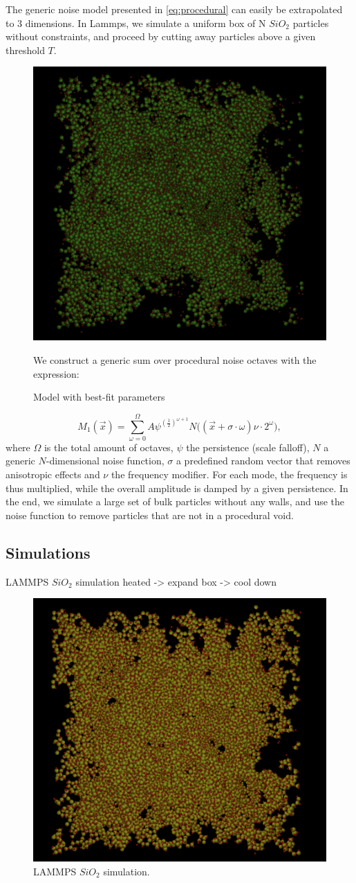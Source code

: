 \documentclass[aps,pre,twocolumn,letterpaper,floatfix,showpacs]{revtex4}
\begin{document}
The generic noise model presented in \ref{eq:procedural} can easily be extrapolated to 3 dimensions. In Lammps, we
simulate a uniform box of N $SiO_2$ particles without constraints, and proceed by cutting away particles above a given threshold $T$.
\begin{figure}
\includegraphics[width=.45\textwidth]{pores2.png}
%
\caption{Model with best-fit parameters}
We construct a generic sum over procedural noise octaves with the expression: 
\label{fig:model12}
\end{figure}
\begin{equation}
	M_1(\vec x) = \sum_{\omega=0}^{\Omega} A \psi^{(\frac{1}{2})^{\omega +1}}   N\big((\vec x + \sigma \cdot \omega)\nu \cdot 2^\omega \big),
\label{eq:noisemodel1}
\end{equation}
where $\Omega$ is the total amount of octaves, $\psi$ the persistence (scale falloff), $N$ a generic $N$-dimensional noise function, $\sigma$ a predefined random vector that removes anisotropic effects and $\nu$ the frequency modifier. For each mode, the frequency is thus multiplied, while the overall amplitude is damped by a given persistence. In the end, we simulate a large set of bulk particles without any walls, and use the noise function to remove particles that are not in a procedural void. 


\subsection{Simulations}
LAMMPS $SiO_2$ simulation heated -> expand box -> cool down
\begin{figure}
\includegraphics[width=.45\textwidth]{pores1.png}
%
\caption{LAMMPS $SiO_2$ simulation.}
\label{fig:model12}
\end{figure}
\end{document}
